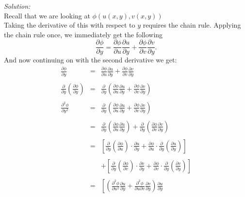 \documentclass[10pt]{amsart}
\theoremstyle{nonumberplain}
\begin{document}
\begin{enumerate}[label={\bf {\arabic*}:}]
\textit{Solution:} \\
Recall that we are looking at $\phi(u(x, y), v(x, y))$\\
Taking the derivative of this with respect to $y$ requires the chain rule.
Applying the chain rule once, we immediately get the following \\
$$\frac{\partial\phi}{\partial y} = \frac{\partial\phi}{\partial u} \frac{\partial u}{\partial y} + \frac{\partial\phi}{\partial v} \frac{\partial v}{\partial y}.$$
And now continuing on with the second derivative we get:
\begin{eqnarray*}
\frac{\partial\phi}{\partial y} &=& \frac{\partial\phi}{\partial u} \frac{\partial u}{\partial y} + \frac{\partial\phi}{\partial v} \frac{\partial v}{\partial y} \\ \\
\frac{\partial}{\partial y} \left(\frac{\partial\phi}{\partial y}\right) &=& \frac{\partial}{\partial y} \left(\frac{\partial\phi}{\partial u} \frac{\partial u}{\partial y} + \frac{\partial\phi}{\partial v} \frac{\partial v}{\partial y}\right) \\ \\
\frac{\partial^2\phi}{\partial y^2} &=& \frac{\partial}{\partial y} \left(\frac{\partial\phi}{\partial u} \frac{\partial u}{\partial y} + \frac{\partial\phi}{\partial v} \frac{\partial v}{\partial y}\right) \\ \\
						&=& \frac{\partial}{\partial y} \left(\frac{\partial\phi}{\partial u} \frac{\partial u}{\partial y}\right)
							+ \frac{\partial}{\partial y}  \left(\frac{\partial\phi}{\partial v} \frac{\partial v}{\partial y}\right) \\ \\
						&=& \left[ 
							\frac{\partial}{\partial y} \left( \frac{\partial\phi}{\partial u} \right) \cdot \frac{\partial u}{\partial y}
							+ \frac{\partial\phi}{\partial u} \cdot \frac{\partial}{\partial y} \left(\frac{\partial u}{\partial y} \right)
						\right] \\ \\
						&& + \left[ 
							\frac{\partial}{\partial y} \left( \frac{\partial\phi}{\partial v} \right) \cdot \frac{\partial v}{\partial y}
							+ \frac{\partial\phi}{\partial v} \cdot \frac{\partial}{\partial y} \left(\frac{\partial v}{\partial y} \right)
						\right] \\ \\
						&=& \left[ 
							\left( \frac{\partial^2 \phi}{\partial u^2} \frac{\partial u}{\partial y} + \frac{\partial^2 \phi}{\partial u \partial v} \frac{\partial v}{\partial y} \right) \frac{\partial u}{\partial y}

\end{eqnarray*}
\end{enumerate}
\end{document}
